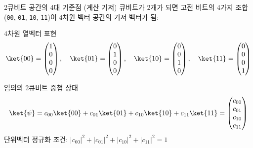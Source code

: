 \documentclass[aspectratio=169, 10pt]{beamer}
\begin{document}
\begin{frame}{2큐비트 공간의 4대 기준점 (계산 기저)}
    큐비트가 2개가 되면 고전 비트의 4가지 조합(\texttt{00}, \texttt{01}, \texttt{10}, \texttt{11})이 4차원 벡터 공간의 기저 벡터가 됨:
    \vspace{0.2cm}
    \begin{qcblock}{4차원 열벡터 표현}
        $$\ket{00} = \begin{pmatrix} 1 \\ 0 \\ 0 \\ 0 \end{pmatrix}, \quad
          \ket{01} = \begin{pmatrix} 0 \\ 1 \\ 0 \\ 0 \end{pmatrix}, \quad
          \ket{10} = \begin{pmatrix} 0 \\ 0 \\ 1 \\ 0 \end{pmatrix}, \quad
          \ket{11} = \begin{pmatrix} 0 \\ 0 \\ 0 \\ 1 \end{pmatrix}$$
    \end{qcblock}
    \pause
    \vspace{0.2cm}
    \begin{qctip}{임의의 2큐비트 중첩 상태}
        $$\ket{\psi} = c_{00}\ket{00} + c_{01}\ket{01} + c_{10}\ket{10} + c_{11}\ket{11} = \begin{pmatrix} c_{00} \\ c_{01} \\ c_{10} \\ c_{11} \end{pmatrix}$$
        단위벡터 정규화 조건: $|c_{00}|^2 + |c_{01}|^2 + |c_{10}|^2 + |c_{11}|^2 = 1$
    \end{qctip}
\end{frame}
\end{document}
